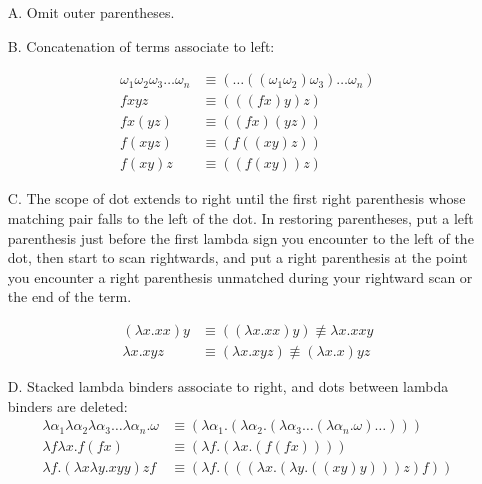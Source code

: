\documentclass[11pt]{article}
\begin{document}
\begin{itemize}

\item[A.] Omit outer parentheses.

\item[B.] Concatenation of terms associate to left:    

\begin{align*}
\omega_1\omega_2\omega_3\ldots\omega_n & \equiv (\ldots((\omega_1\omega_2)\omega_3)\ldots\omega_n)\\
fxyz & \equiv   (((fx)y)z)\\
fx(yz) & \equiv   ((fx)(yz))\\
f(xyz) & \equiv   (f((xy)z))\\
f(xy)z & \equiv   ((f(xy))z) 
\end{align*}

\item[C.] The scope of dot extends to right until the first right parenthesis whose matching pair falls to the left of the dot. In restoring parentheses, put a left parenthesis just before the first lambda sign you encounter to the left of the dot, then start to scan rightwards, and put a right parenthesis at the point you encounter a right parenthesis unmatched during your rightward scan or the end of the term.

\begin{align*}
(\lambda x.xx)y & \equiv ((\lambda x.xx)y) \not\equiv \lambda x.xxy\\
\lambda x.xyz & \equiv (\lambda x.xyz) \not\equiv (\lambda x. x)yz
\end{align*}

\item[D.] Stacked lambda binders associate to right, and dots between lambda binders are deleted:
\begin{align*}
\lambda \alpha_1\lambda \alpha_2\lambda \alpha_3\ldots\lambda \alpha_n.\omega &\equiv (\lambda\alpha_1.(\lambda\alpha_2.(\lambda\alpha_3\ldots(\lambda\alpha_n.\omega)\ldots)))\\
\lambda f \lambda x.f(fx)  &\equiv  (\lambda f.(\lambda x.(f(fx))))\\
\lambda f.(\lambda x\lambda y.xyy)zf & \equiv (\lambda f.(((\lambda x.(\lambda y.((xy)y)))z)f))
\end{align*}

\end{itemize}
\end{document}

